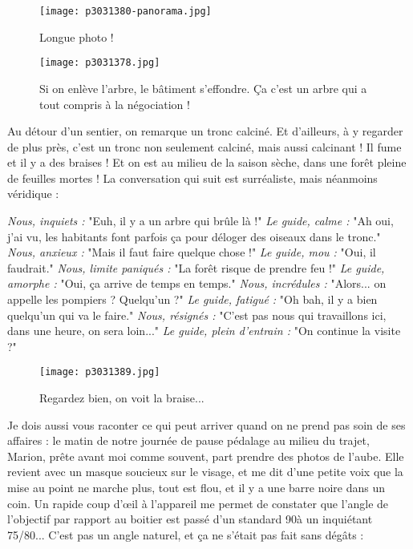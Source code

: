 \documentclass{book}
\begin{document}
\begin{figure}[h]
\centering
\texttt{[image: p3031380-panorama.jpg]}
\caption*{Longue photo !}
\end{figure}


\begin{figure}[h]
\centering
\texttt{[image: p3031378.jpg]}
\caption*{Si on enlève l'arbre, le bâtiment s'effondre. Ça c'est un arbre qui a tout compris à la négociation !}
\end{figure}

Au détour d'un sentier, on remarque un tronc calciné. Et d'ailleurs, à y regarder de plus près, c'est un tronc non seulement calciné, mais aussi calcinant ! Il fume et il y a des braises ! Et on est au milieu de la saison sèche, dans une forêt pleine de feuilles mortes ! La conversation qui suit est surréaliste, mais néanmoins véridique :

\emph{Nous, inquiets :} "Euh, il y a un arbre qui brûle là !"
\emph{Le guide, calme :} "Ah oui, j'ai vu, les habitants font parfois ça pour déloger des oiseaux dans le tronc."
\emph{Nous, anxieux :} "Mais il faut faire quelque chose !"
\emph{Le guide, mou :} "Oui, il faudrait."
\emph{Nous, limite paniqués :} "La forêt risque de prendre feu !"
\emph{Le guide, amorphe :} "Oui, ça arrive de temps en temps."
\emph{Nous, incrédules :} "Alors... on appelle les pompiers ? Quelqu'un ?"
\emph{Le guide, fatigué :} "Oh bah, il y a bien quelqu'un qui va le faire."
\emph{Nous, résignés :} "C'est pas nous qui travaillons ici, dans une heure, on sera loin..."
\emph{Le guide, plein d'entrain :} "On continue la visite ?"


\begin{figure}[h]
\centering
\texttt{[image: p3031389.jpg]}
\caption*{Regardez bien, on voit la braise...}
\end{figure}

Je dois aussi vous raconter ce qui peut arriver quand on ne prend pas soin de ses affaires : le matin de notre journée de pause pédalage au milieu du trajet, Marion, prête avant moi comme souvent, part prendre des photos de l'aube. Elle revient avec un masque soucieux sur le visage, et me dit d'une petite voix que la mise au point ne marche plus, tout est flou, et il y a une barre noire dans un coin. Un rapide coup d’œil à l'appareil me permet de constater que l'angle de l'objectif par rapport au boitier est passé d'un standard 90\textdegree  à un inquiétant 75\textdegree /80\textdegree ... C'est pas un angle naturel, et ça ne s'était pas fait sans dégâts :
\end{document}
